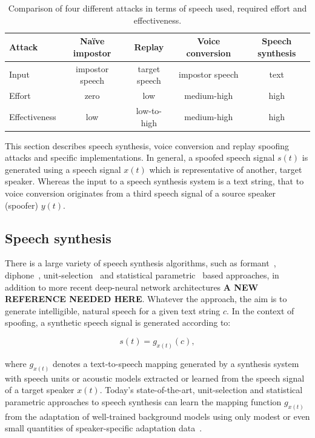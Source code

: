 \begin{table}
\renewcommand{\arraystretch}{1.3}
\begin{center}
    \begin{tabular}{ l | c c c c }
    \hline
     	 Attack & Na\"{i}ve impostor &  Replay & Voice conversion & Speech synthesis\\ 
    \hline
Input         & impostor speech  & target speech & impostor speech & text\\
Effort        & zero & low & medium-high & high\\
Effectiveness & low &  low-to-high & medium-high & high\\
 \hline
\hline
    \end{tabular}
    \caption{Comparison of four different attacks in terms of speech used,  required effort and effectiveness.}
		\label{tab::attacks}
   \end{center}
\end{table}

This section describes speech synthesis, voice conversion and replay spoofing attacks and specific implementations.  In general, a spoofed speech signal $s(t)$ is generated using a speech signal $x(t)$ which is representative of another, target speaker.  Whereas the input to a speech synthesis system is a text string, that to voice conversion originates from a third speech signal of a source speaker (spoofer) $y(t)$.  



\subsection{Speech synthesis}
\label{ssec:spsyn}

There is a large variety of speech synthesis algorithms, such as formant~\cite{Klatt1980}, diphone~\cite{Moulines1990}, unit-selection~\cite{Hunt1996} and statistical parametric~\cite{Tokuda2000} based approaches, in addition to more recent deep-neural network architectures {\bfseries A NEW REFERENCE NEEDED HERE}.  Whatever the approach, the aim is to generate intelligible, natural speech for a given text string $c$. In the context of spoofing, a synthetic speech signal is generated according to:

\begin{equation}
s(t) = g_{x(t)}(c),
\label{eq:tts}
\end{equation}

\noindent where $g_{x(t)}$ denotes a text-to-speech mapping generated by a synthesis system with speech units or acoustic models extracted or learned from the speech signal of a target speaker $x(t)$.  Today's state-of-the-art, unit-selection and statistical parametric approaches to speech synthesis can learn the mapping function $g_{x(t)}$ from the adaptation of well-trained background models using only modest or even small quantities of speaker-specific adaptation data~\cite{Zen2007a}.  

